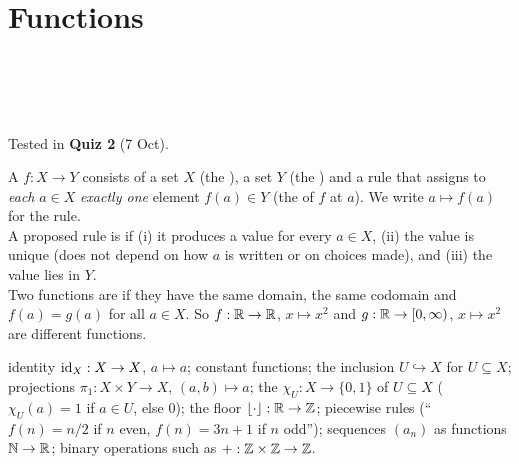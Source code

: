 \chapter{Functions}
%
{\\ \\ \\ \\ Tested in \textbf{Quiz 2} (7 Oct).}


\begin{key}[Function]
A  $f:X\to Y$ consists of a set $X$ (the ), a set $Y$ (the ) and a rule that assigns to \emph{each} $a\in X$ \emph{exactly one} element $f(a)\in Y$ (the  of $f$ at $a$). We write $a\mapsto f(a)$ for the rule.\\
A proposed rule is  if (i) it produces a value for every $a\in X$, (ii) the value is unique (does not depend on how $a$ is written or on choices made), and (iii) the value lies in $Y$.\\
Two functions are  if they have the same domain, the same codomain and $f(a)=g(a)$ for all $a\in X$. So $f:\mathbb{R}\to\mathbb{R}$, $x\mapsto x^2$ and $g:\mathbb{R}\to[0,\infty)$, $x\mapsto x^2$ are different functions.
\end{key}

\begin{key}
identity $\mathrm{id}_X:X\to X$, $a\mapsto a$; constant functions; the inclusion $U\hookrightarrow X$ for $U\subseteq X$; projections $\pi_1:X\times Y\to X$, $(a,b)\mapsto a$; the  $\chi_U:X\to\{0,1\}$ of $U\subseteq X$ ($\chi_U(a)=1$ if $a\in U$, else $0$); the floor $\lfloor\cdot\rfloor:\mathbb{R}\to\mathbb{Z}$; piecewise rules (``$f(n)=n/2$ if $n$ even, $f(n)=3n+1$ if $n$ odd''); sequences $(a_n)$ as functions $\mathbb{N}\to\mathbb{R}$; binary operations such as $+:\mathbb{Z}\times\mathbb{Z}\to\mathbb{Z}$.
\end{key}

